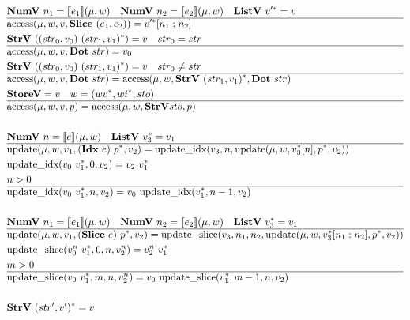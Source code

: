 \begin{align*}
  &\numv ~ n_1 = \sem{e_1}(\mu, w) \quad
  \numv ~ n_2 = \sem{e_2}(\mu, w) \quad
  \listv ~ \seq{v'} = v \\
  \hline
  &\access(\mu, w, v, \slicep ~ (e_1, e_2)) = \seq{v'}[n_1: n_2] \\
  &\strv ~ ((str_0, v_0) ~ \seq{(str_1, v_1)}) = v \quad
  str_0 = str \\
  \hline
  &\access(\mu, w, v, \dotp ~ str) = v_0 \\
  &\strv ~ ((str_0, v_0) ~ \seq{(str_1, v_1)}) = v \quad
  str_0 \not= str \\
  \hline
  &\access(\mu, w, v, \dotp ~ str) = \access(\mu, w, \strv ~ \seq{(str_1, v_1)}, \dotp ~ str) \\
  &\storev = v \quad w = (\seq{wv}, \seq{wi}, sto)\\
  \hline
  &\access(\mu, w, v, p)
  =\access(\mu, w, \strv sto, p) \\
%
\newline \\
  &\numv ~ n = \sem{e}(\mu, w) \quad
  \listv ~ \seq{v_3} = v_1 \\
  \hline
  &\update(\mu, w, v_1, (\idxp ~ e) ~ \seq{p}, v_2)
  =
  \updateidx(v_3, n, \update(\mu, w, \seq{v_3}[n], \seq{p}, v_2)) \\
  &\updateidx(v_0 ~ \seq{v_1}, 0, v_2) =  v_2 ~ \seq{v_1} \\
  &n > 0 \\
  \hline
  &\updateidx(v_0 ~ \seq{v_1}, n, v_2) =  v_0 ~ \updateidx(\seq{v_1}, n-1, v_2) \\
%
\newline \\
  &\numv ~ n_1 = \sem{e_1}(\mu, w) \quad
  \numv ~ n_2 = \sem{e_2}(\mu, w) \quad
  \listv ~ \seq{v_3} = v_1 \\
  \hline
  &\update(\mu, w, v_1, (\slicep ~ e) ~ \seq{p}, v_2)
  =
  \updateslice(v_3, n_1, n_2, \update(\mu, w, \seq{v_3}[n_1: n_2], \seq{p}, v_2)) \\
  &\updateslice(v_0^n ~ \seq{v_1}, 0, n, v_2^n) = v_2^n ~ \seq{v_1} \\
  &m > 0 \\
  \hline
  &\updateslice(v_0 ~ \seq{v_1}, m, n, v_2^n) =  v_0 ~ \updateslice(\seq{v_1}, m-1, n, v_2) \\
%
\newline \\
  &\strv ~ \seq{(str', v')} = v \\

\end{align*}
